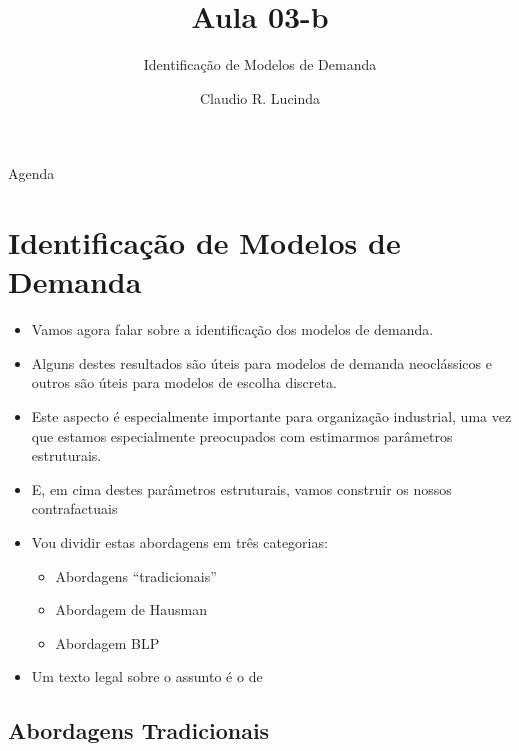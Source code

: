 \documentclass{beamer}
\title{Aula 03-b}
\subtitle{Identificação de Modelos de Demanda}
\author{Claudio R. Lucinda}
\institute{FEA/USP}
\date{}
\begin{document}
\frame{\titlepage}
\begin{frame}{Agenda}
  \tableofcontents[pausesections]
\end{frame}


\section{Identificação de Modelos de Demanda}
\begin{frame}{\insertsection}
\begin{itemize}
    \item Vamos agora falar sobre a identificação dos modelos de demanda.
    \item Alguns destes resultados são úteis para modelos de demanda neoclássicos e outros são úteis para modelos de escolha discreta.
    \item Este aspecto é especialmente importante para organização industrial, uma vez que estamos especialmente preocupados com estimarmos parâmetros estruturais.
    \item E, em cima destes parâmetros estruturais, vamos construir os nossos contrafactuais
    \item Vou dividir estas abordagens em três categorias:
    \begin{itemize}
        \item Abordagens ``tradicionais''
        \item Abordagem de Hausman
        \item Abordagem BLP
    \end{itemize}
    \item Um texto legal sobre o assunto é o de \citet{Bresnahan1997a}
\end{itemize}

    
\end{frame}

\subsection{Abordagens Tradicionais}
\end{document}
